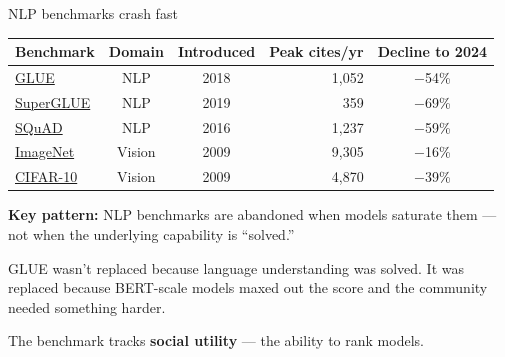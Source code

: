 \documentclass[aspectratio=169,11pt]{beamer}
\begin{document}
\begin{frame}{NLP benchmarks crash fast}

\begin{center}
{\small
\begin{tabular}{lccrc}
\toprule
\textbf{Benchmark} & \textbf{Domain} & \textbf{Introduced} & \textbf{Peak cites/yr} & \textbf{Decline to 2024} \\
\midrule
\href{https://arxiv.org/abs/1804.07461}{GLUE} & NLP & 2018 & 1,052 & \textcolor{fail}{$-$54\%} \\
\href{https://arxiv.org/abs/1905.00537}{SuperGLUE} & NLP & 2019 & 359 & \textcolor{fail}{$-$69\%} \\
\href{https://arxiv.org/abs/1606.05250}{SQuAD} & NLP & 2016 & 1,237 & \textcolor{fail}{$-$59\%} \\
\midrule
\href{https://en.wikipedia.org/wiki/ImageNet}{ImageNet} & Vision & 2009 & 9,305 & \textcolor{pass}{$-$16\%} \\
\href{https://en.wikipedia.org/wiki/CIFAR-10}{CIFAR-10} & Vision & 2009 & 4,870 & \textcolor{counter}{$-$39\%} \\
\bottomrule
\end{tabular}
}
\end{center}

\vspace{0.3em}
{\small \textbf{Key pattern:} NLP benchmarks are abandoned when models saturate them --- not when the underlying capability is ``solved.''}

\vspace{0.2em}
{\small GLUE wasn't replaced because language understanding was solved. It was replaced because BERT-scale models maxed out the score and the community needed something harder.}

\vspace{0.2em}
{\small The benchmark tracks \textbf{social utility} --- the ability to rank models.}
\end{frame}



\begin{frame}[plain,label=part2]
\vfill
\begin{center}
  \setlength{\fboxrule}{2.5pt}%
\end{center}
\vfill
\end{frame}
\end{document}
